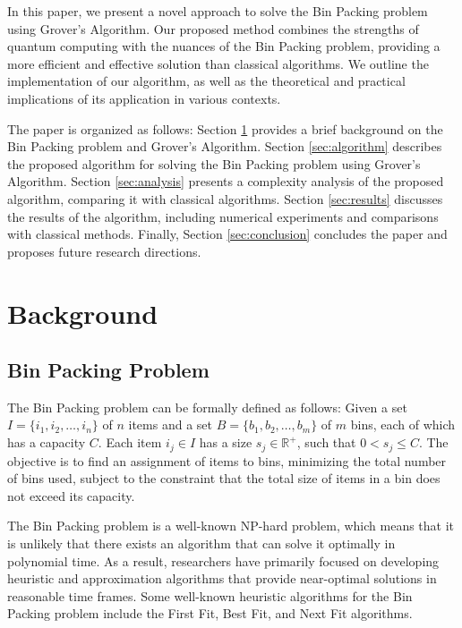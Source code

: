 In this paper, we present a novel approach to solve the Bin Packing problem using Grover's Algorithm. Our proposed method combines the strengths of quantum computing with the nuances of the Bin Packing problem, providing a more efficient and effective solution than classical algorithms. We outline the implementation of our algorithm, as well as the theoretical and practical implications of its application in various contexts.

The paper is organized as follows: Section \ref{sec:background} provides a brief background on the Bin Packing problem and Grover's Algorithm. Section \ref{sec:algorithm} describes the proposed algorithm for solving the Bin Packing problem using Grover's Algorithm. Section \ref{sec:analysis} presents a complexity analysis of the proposed algorithm, comparing it with classical algorithms. Section \ref{sec:results} discusses the results of the algorithm, including numerical experiments and comparisons with classical methods. Finally, Section \ref{sec:conclusion} concludes the paper and proposes future research directions.

\section{Background} \label{sec:background}

\subsection{Bin Packing Problem}

The Bin Packing problem can be formally defined as follows: Given a set $I = \{i_1, i_2, \dots, i_n\}$ of $n$ items and a set $B = \{b_1, b_2, \dots, b_m\}$ of $m$ bins, each of which has a capacity $C$. Each item $i_j \in I$ has a size $s_j \in \mathbb{R}^+$, such that $0 < s_j \leq C$. The objective is to find an assignment of items to bins, minimizing the total number of bins used, subject to the constraint that the total size of items in a bin does not exceed its capacity.

The Bin Packing problem is a well-known NP-hard problem, which means that it is unlikely that there exists an algorithm that can solve it optimally in polynomial time. As a result, researchers have primarily focused on developing heuristic and approximation algorithms that provide near-optimal solutions in reasonable time frames. Some well-known heuristic algorithms for the Bin Packing problem include the First Fit, Best Fit, and Next Fit algorithms.

